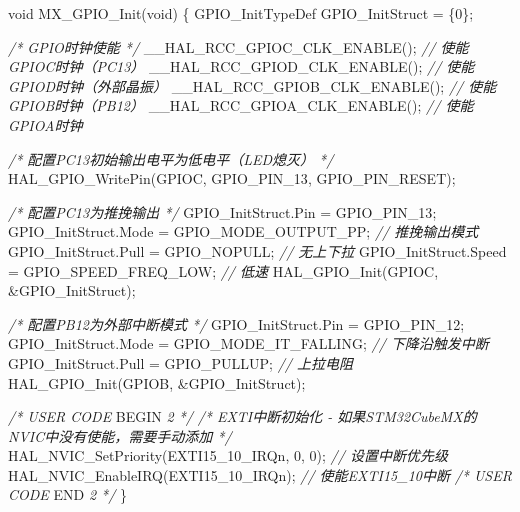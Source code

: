 \documentclass[
  chinese,
  UTF8,
  oneside,
  openany]{ctexbook}
\newenvironment{Shaded}{}{}
\newcommand{\CommentTok}[1]{\textcolor[rgb]{0.38,0.63,0.69}{\textit{#1}}}
\newcommand{\DataTypeTok}[1]{\textcolor[rgb]{0.56,0.13,0.00}{#1}}
\newcommand{\DecValTok}[1]{\textcolor[rgb]{0.25,0.63,0.44}{#1}}
\newcommand{\NormalTok}[1]{#1}
\newcommand{\OperatorTok}[1]{\textcolor[rgb]{0.40,0.40,0.40}{#1}}
\newcommand{\RegionMarkerTok}[1]{#1}
\begin{document}
\begin{Shaded}
\begin{Highlighting}[]
\DataTypeTok{void}\NormalTok{ MX\_GPIO\_Init}\OperatorTok{(}\DataTypeTok{void}\OperatorTok{)}
\OperatorTok{\{}
\NormalTok{  GPIO\_InitTypeDef GPIO\_InitStruct }\OperatorTok{=} \OperatorTok{\{}\DecValTok{0}\OperatorTok{\};}

  \CommentTok{/* GPIO时钟使能 */}
\NormalTok{  \_\_HAL\_RCC\_GPIOC\_CLK\_ENABLE}\OperatorTok{();}  \CommentTok{// 使能GPIOC时钟（PC13）}
\NormalTok{  \_\_HAL\_RCC\_GPIOD\_CLK\_ENABLE}\OperatorTok{();}  \CommentTok{// 使能GPIOD时钟（外部晶振）}
\NormalTok{  \_\_HAL\_RCC\_GPIOB\_CLK\_ENABLE}\OperatorTok{();}  \CommentTok{// 使能GPIOB时钟（PB12）}
\NormalTok{  \_\_HAL\_RCC\_GPIOA\_CLK\_ENABLE}\OperatorTok{();}  \CommentTok{// 使能GPIOA时钟}

  \CommentTok{/* 配置PC13初始输出电平为低电平（LED熄灭） */}
\NormalTok{  HAL\_GPIO\_WritePin}\OperatorTok{(}\NormalTok{GPIOC}\OperatorTok{,}\NormalTok{ GPIO\_PIN\_13}\OperatorTok{,}\NormalTok{ GPIO\_PIN\_RESET}\OperatorTok{);}

  \CommentTok{/* 配置PC13为推挽输出 */}
\NormalTok{  GPIO\_InitStruct}\OperatorTok{.}\NormalTok{Pin }\OperatorTok{=}\NormalTok{ GPIO\_PIN\_13}\OperatorTok{;}
\NormalTok{  GPIO\_InitStruct}\OperatorTok{.}\NormalTok{Mode }\OperatorTok{=}\NormalTok{ GPIO\_MODE\_OUTPUT\_PP}\OperatorTok{;}  \CommentTok{// 推挽输出模式}
\NormalTok{  GPIO\_InitStruct}\OperatorTok{.}\NormalTok{Pull }\OperatorTok{=}\NormalTok{ GPIO\_NOPULL}\OperatorTok{;}          \CommentTok{// 无上下拉}
\NormalTok{  GPIO\_InitStruct}\OperatorTok{.}\NormalTok{Speed }\OperatorTok{=}\NormalTok{ GPIO\_SPEED\_FREQ\_LOW}\OperatorTok{;} \CommentTok{// 低速}
\NormalTok{  HAL\_GPIO\_Init}\OperatorTok{(}\NormalTok{GPIOC}\OperatorTok{,} \OperatorTok{\&}\NormalTok{GPIO\_InitStruct}\OperatorTok{);}

  \CommentTok{/* 配置PB12为外部中断模式 */}
\NormalTok{  GPIO\_InitStruct}\OperatorTok{.}\NormalTok{Pin }\OperatorTok{=}\NormalTok{ GPIO\_PIN\_12}\OperatorTok{;}
\NormalTok{  GPIO\_InitStruct}\OperatorTok{.}\NormalTok{Mode }\OperatorTok{=}\NormalTok{ GPIO\_MODE\_IT\_FALLING}\OperatorTok{;}  \CommentTok{// 下降沿触发中断}
\NormalTok{  GPIO\_InitStruct}\OperatorTok{.}\NormalTok{Pull }\OperatorTok{=}\NormalTok{ GPIO\_PULLUP}\OperatorTok{;}           \CommentTok{// 上拉电阻}
\NormalTok{  HAL\_GPIO\_Init}\OperatorTok{(}\NormalTok{GPIOB}\OperatorTok{,} \OperatorTok{\&}\NormalTok{GPIO\_InitStruct}\OperatorTok{);}

  \CommentTok{/* USER CODE }\RegionMarkerTok{BEGIN}\CommentTok{ 2 */}
  \CommentTok{/* EXTI中断初始化 {-} 如果STM32CubeMX的NVIC中没有使能，需要手动添加 */}
\NormalTok{  HAL\_NVIC\_SetPriority}\OperatorTok{(}\NormalTok{EXTI15\_10\_IRQn}\OperatorTok{,} \DecValTok{0}\OperatorTok{,} \DecValTok{0}\OperatorTok{);}  \CommentTok{// 设置中断优先级}
\NormalTok{  HAL\_NVIC\_EnableIRQ}\OperatorTok{(}\NormalTok{EXTI15\_10\_IRQn}\OperatorTok{);}          \CommentTok{// 使能EXTI15\_10中断}
  \CommentTok{/* USER CODE }\RegionMarkerTok{END}\CommentTok{ 2 */}
\OperatorTok{\}}
\end{Highlighting}
\end{Shaded}
\end{document}
